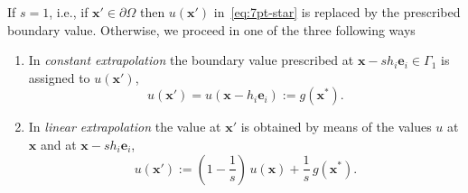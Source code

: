\documentclass[a4paper,10pt,3p,preprint,pdftex]{elsarticle}
\begin{document}
If $s=1$, i.e., if $\mathbf{x}'\in \partial\Omega$ then $u(\mathbf{x}')$
in~\eqref{eq:7pt-star} is replaced by the prescribed boundary value.
Otherwise, we proceed in one of the three following ways~\cite{fowa:60,
  hack:94}
\begin{enumerate}
\item In \emph{constant extrapolation} the boundary value prescribed at
  $\mathbf{x} - s h_i\mathbf{e}_i \in \Gamma_1$ is assigned to
  $u(\mathbf{x}')$,
  \begin{equation}
    \label{eq:const_extrapol}
    u(\mathbf{x}') = u(\mathbf{x} - h_i\mathbf{e}_i) := g(\mathbf{x}^*).
  \end{equation}
\item In \emph{linear extrapolation} the value at $\mathbf{x}'$ is
  obtained by means of the values $u$ at $\mathbf{x}$ and at $\mathbf{x}
  - sh_i\mathbf{e}_i$,
  \begin{equation}
    \label{eq:lin_extrapol}
    u(\mathbf{x}') := (1-\frac{1}{s})\, u(\mathbf{x}) + \frac{1}{s}\,
    g(\mathbf{x}^*).
  \end{equation}


\end{enumerate}
\end{document}
